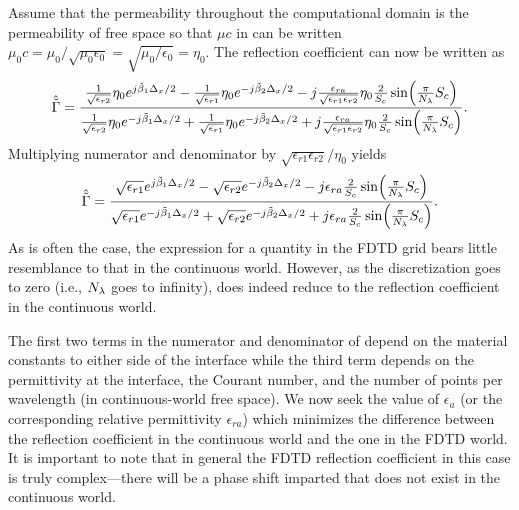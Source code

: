 Assume that the permeability throughout the computational domain is
the permeability of free space so that $\mu c$ in
 can be written $\mu_0
c=\mu_0/\sqrt{\mu_0\epsilon_0} = \sqrt{\mu_0/\epsilon_0} = \eta_0$.
The reflection coefficient  can now be written
as
\begin{equation}
  \hat{\tilde{\Gamma}} = \frac{\frac{1}{\sqrt{\epsilon_{r2}}}\eta_0 e^{j\tilde{\beta}_1\Delta_x/2} - 
                \frac{1}{\sqrt{\epsilon_{r1}}}\eta_0 e^{-j\tilde{\beta}_2\Delta_x/2} - 
                j\frac{\epsilon_{ra}}{\sqrt{\epsilon_{r1}\epsilon_{r2}}}
                \eta_0 \frac{2}{S_c}
                \sin\!\left(\frac{\pi}{N_\lambda} S_c\right)}
              {\frac{1}{\sqrt{\epsilon_{r2}}}\eta_0 e^{-j\tilde{\beta}_1\Delta_x/2} +
                \frac{1}{\sqrt{\epsilon_{r1}}}\eta_0 e^{-j\tilde{\beta}_2\Delta_x/2} + 
                j\frac{\epsilon_{ra}}{\sqrt{\epsilon_{r1}\epsilon_{r2}}}
                \eta_0 \frac{2}{S_c}
                \sin\!\left(\frac{\pi}{N_\lambda} S_c\right)}.
  \label{eq:gammaAverageI}
\end{equation}
Multiplying numerator and denominator by
$\sqrt{\epsilon_{r1}\epsilon_{r2}}/\eta_0$ yields
\begin{equation}
  \hat{\tilde{\Gamma}} = \frac{\sqrt{\epsilon_{r1}} e^{j\tilde{\beta}_1\Delta_x/2} - 
                 \sqrt{\epsilon_{r2}} e^{-j\tilde{\beta}_2\Delta_x/2} - 
                j \epsilon_{ra} \frac{2}{S_c}
                \sin\!\left(\frac{\pi}{N_\lambda} S_c\right)}
              {\sqrt{\epsilon_{r1}} e^{-j\tilde{\beta}_1\Delta_x/2} +
               \sqrt{\epsilon_{r2}} e^{-j\tilde{\beta}_2\Delta_x/2} + 
                j\epsilon_{ra} \frac{2}{S_c}
                \sin\!\left(\frac{\pi}{N_\lambda} S_c\right)}.
  \label{eq:gammaAverageII}
\end{equation}
As is often the case, the expression for a quantity in the FDTD grid
bears little resemblance to that in the continuous world.  However, as
the discretization goes to zero (i.e., $N_\lambda$ goes to infinity),
 does indeed reduce to the reflection
coefficient in the continuous world.

The first two terms in the numerator and denominator of
 depend on the material constants to either
side of the interface while the third term depends on the permittivity
at the interface, the Courant number, and the number of points per
wavelength (in continuous-world free space).  We now seek the value of
$\epsilon_a$ (or the corresponding relative permittivity
$\epsilon_{ra}$) which minimizes the difference between the reflection
coefficient in the continuous world and the one in the FDTD world.  It
is important to note that in general the FDTD reflection coefficient
in this case is truly complex---there will be a phase shift imparted
that does not exist in the continuous world.

